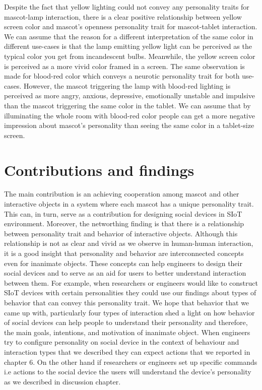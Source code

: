 \par Despite the fact that yellow lighting could not convey any personality traits for
mascot-lamp interaction, there is a clear positive relationship between yellow screen color
and mascot’s openness personality trait for mascot-tablet interaction.
We can assume that the reason for a different interpretation of the same color in different
use-cases is that the lamp emitting yellow light can be perceived as the
typical color you get from incandescent bulbs.
Meanwhile, the yellow screen color is perceived as a more vivid color framed in a screen.
The same observation is made for blood-red color which conveys a neurotic personality trait for both use-cases.
However, the mascot triggering the lamp with blood-red lighting is perceived as
more angry, anxious, depressive, emotionally unstable and impulsive than the
mascot triggering the same color in the tablet.
We can assume that by illuminating the whole room with blood-red color people can
get a more negative impression about mascot’s personality than seeing the same color in a tablet-size screen.

\section{Contributions and findings}
\label{sec:contributions-and-findings}
The main contribution is an achieving cooperation among mascot and other interactive
objects in a system where each mascot has a unique personality trait.
This can, in turn, serve as a contribution for designing social devices in SIoT environment.
Moreover, the networthing finding is that there is a relationship between
personality trait and behavior of interactive objects.
Although this relationship is not as clear and vivid as we observe in human-human interaction,
it is a good insight that personality and behavior are interconnected concepts even for inanimate objects.
These concepts can help engineers to design their social devices and to serve as an
aid for users to better understand interaction between them.
For example, when researchers or engineers would like to construct SIoT devices
with certain personalities they could use our findings about types of behavior that can
convey this personality trait.
We hope that behavior that we came up with, particularly four types of interaction shed
a light on how behavior of social devices can help people to understand their personality and
therefore, the main goals, intentions, and motivation of inanimate object.
When engineers try to configure personality on social device in the context of behaviour and
interaction types that we described they can expect actions that we reported in chapter 6.
On the other hand if researchers or engineers set up specific commands i.e actions to the
social device the users will understand the device's personality as we described in discussion chapter.

